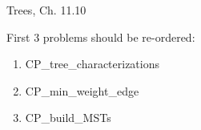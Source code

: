 \documentclass[handout]{mcs}
\begin{document}

\begin{staffnotes}
Trees, Ch. 11.10 
\end{staffnotes}


\begin{editingnotes}
First 3 problems should be re-ordered:
\begin{enumerate}

\item CP_tree_characterizations

\item CP_min_weight_edge

\item CP_build_MSTs

\end{enumerate}
\end{editingnotes}







\end{document}
